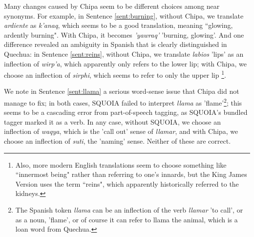 Many changes caused by Chipa seem to be different choices among near synonyms.
For example, in Sentence \ref{sent:burning}, without Chipa, we translate
\emph{ardiente} as \emph{k'anaq}, which seems to be a good translation, meaning
``glowing, ardently burning". With Chipa, it becomes \emph{'yawraq'} 'burning,
glowing'. And one difference revealed an ambiguity in Spanish that is clearly
distinguished in Quechua: in Sentence \ref{sent:reins}, without Chipa, we
translate \emph{labios} 'lips' as an inflection of \emph{wirp'a}, which
apparently only refers to the lower lip; with Chipa, we choose an inflection of
\emph{sirphi}, which seems to refer to only the upper lip
\footnote{Also, more modern English translations seem to choose something like
``innermost being" rather than referring to one's innards, but the King James
Version uses the term ``reins", which apparently historically referred to the
kidneys.}.

We note in Sentence \ref{sent:llama} a serious word-sense issue that Chipa did
not manage to fix; in both cases, SQUOIA failed to interpret \emph{llama} as
'flame'\footnote{The Spanish token \emph{llama} can be an inflection of the
verb \emph{llamar} 'to call', or as a noun, 'flame', or of course it can refer
to llama the animal, which is a loan word from Quechua.}; this seems to be a
cascading error from part-of-speech tagging, as SQUOIA's bundled tagger marked
it as a verb. In any case, without SQUOIA, we choose an inflection of
\emph{waqya}, which is the 'call out' sense of \emph{llamar}, and with Chipa,
we choose an inflection of \emph{suti}, the 'naming' sense. Neither of these
are correct.

